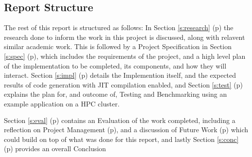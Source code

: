 \clearpage
\subsection{Report Structure}
The rest of this report is structured as follows: In Section \ref{s:research} (p\pageref{s:research}) the research done to inform the work in this project is discussed, along with relavent similar academic work. This is followed by a Project Specification in Section \ref{s:spec} (p\pageref{s:spec}), which includes the requirements of the project, and a high level plan of the implementation to be completed, its components, and how they will interact.
Section \ref{s:impl} (p\pageref{s:impl}) details the Implemention itself, and the expected results of code generation with JIT compilation enabled, and Section \ref{s:test} (p\pageref{s:test}) explains the plan for, and outcome of, Testing and Benchmarking using an example application on a HPC cluster.
\par Section \ref{s:eval} (p\pageref{s:eval}) contains an Evaluation of the work completed, including a reflection on Project Management (p\pageref{ss:pm}), and a discussion of Future Work (p\pageref{ss:fw}) which could build on top of what was done for this report, and lastly Section \ref{s:conc} (p\pageref{s:conc}) provides an overall Conclusion
